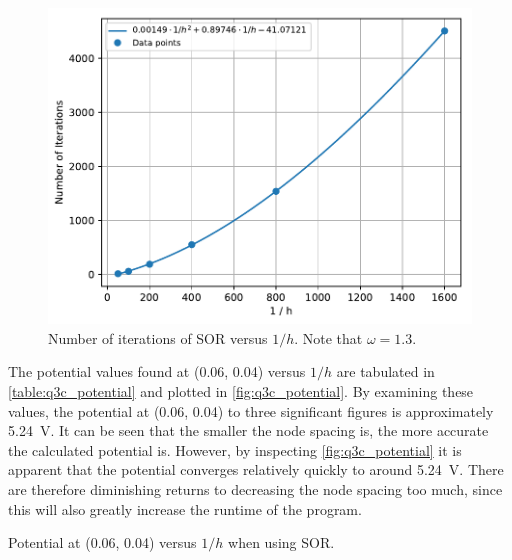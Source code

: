 \documentclass[a4paper,titlepage]{article}
\begin{document}
	\begin{figure}[!htb]
		\centering
		\includegraphics[width=\columnwidth]{plots/q3c_iterations.pdf}
		\caption
		{Number of iterations of SOR versus $1/h$. Note that $\omega=1.3$.}
		\label{fig:q3c_iterations}
	\end{figure}

	The potential values found at (0.06, 0.04) versus $1/h$ are tabulated in \autoref{table:q3c_potential} and plotted in \autoref{fig:q3c_potential}. By examining these values, the potential at (0.06, 0.04) to three significant figures is approximately \SI{5.24}{\volt}. It can be seen that the smaller the node spacing is, the more accurate the calculated potential is. However, by inspecting \autoref{fig:q3c_potential} it is apparent that the potential converges relatively quickly to around \SI{5.24}{\volt}. There are therefore diminishing returns to decreasing the node spacing too much, since this will also greatly increase the runtime of the program.

	\begin{table}[!htb]
		\centering
		\caption{Potential at (0.06, 0.04) versus $1/h$ when using SOR.}
		\label{table:q3c_potential}
	\end{table}
\end{document}
